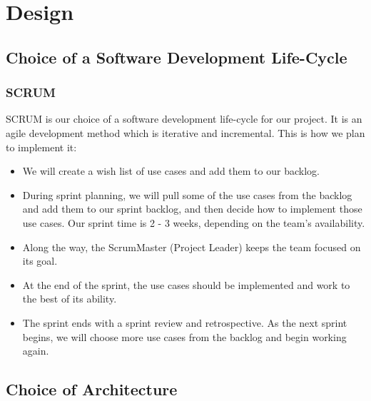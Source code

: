 \documentclass{article}
\begin{document}
\section{Design}
\subsection{Choice of a Software Development Life-Cycle}
\subsubsection{SCRUM}
SCRUM is our choice of a software development life-cycle for our project. It is an agile development method which is iterative and incremental.
This is how we plan to implement it:
\begin{itemize}
\item We will create a wish list of use cases and add them to our backlog.
\item During sprint planning, we will pull some of the use cases from the backlog and add them to our sprint backlog, and then decide how to implement those use cases.
Our sprint time is 2 - 3 weeks, depending on the team's availability. 
\item Along the way, the ScrumMaster (Project Leader) keeps the team focused on its goal.
\item At the end of the sprint, the use cases should be implemented and work to the best of its ability. 
\item The sprint ends with a sprint review and retrospective.
As the next sprint begins, we will choose more use cases from the backlog and begin working again. \cite{Scrum}
\end{itemize}
\subsection{Choice of Architecture}
\end{document}
